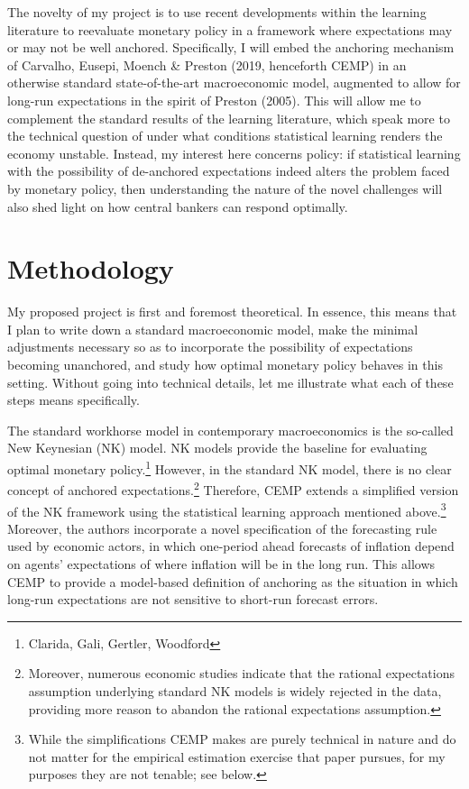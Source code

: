\documentclass[11pt]{article}
\renewcommand{\[}{\begin{equation}}
\renewcommand{\]}{\end{equation}}
\begin{document}
The novelty of my project is to use recent developments within the learning literature to reevaluate monetary policy in a framework where expectations may or may not be well anchored. Specifically, I will embed the anchoring mechanism of Carvalho, Eusepi, Moench \& Preston (2019, henceforth CEMP) in an otherwise standard state-of-the-art macroeconomic model, augmented to allow for long-run expectations in the spirit of Preston (2005). This will allow me to complement the standard results of the learning literature, which speak more to the technical question of under what conditions statistical learning renders the economy unstable. %
Instead, my interest here concerns policy: if statistical learning with the possibility of de-anchored expectations indeed alters the problem faced by monetary policy, then understanding the nature of the novel challenges will also shed light on how central bankers can respond optimally. 


\section{Methodology}

My proposed project is first and foremost theoretical. In essence, this means that I plan to write down a standard macroeconomic model, make the minimal adjustments necessary so as to incorporate the possibility of expectations becoming unanchored, and study how optimal monetary policy behaves in this setting. Without going into technical details, let me illustrate what each of these steps means specifically. 

The standard workhorse model in contemporary macroeconomics is the so-called New Keynesian (NK) model. NK models provide the baseline for evaluating optimal monetary policy.\footnote{Clarida, Gali, Gertler, Woodford} However, in the standard NK model, there is no clear concept of anchored expectations.\footnote{Moreover, numerous economic studies indicate that the rational expectations assumption underlying standard NK models is widely rejected in the data, providing more reason to abandon the rational expectations assumption.} Therefore, CEMP extends a simplified version of the NK framework using the statistical learning approach mentioned above.\footnote{While the simplifications CEMP makes are purely technical in nature and do not matter for the empirical estimation exercise that paper pursues, for my purposes they are not tenable; see below.} Moreover, the authors incorporate a novel specification of the forecasting rule used by economic actors, in which one-period ahead forecasts of inflation depend on agents' expectations of where inflation will be in the long run. This allows CEMP to provide a model-based definition of anchoring as the situation in which long-run expectations are not sensitive to short-run forecast errors. 
\end{document}

